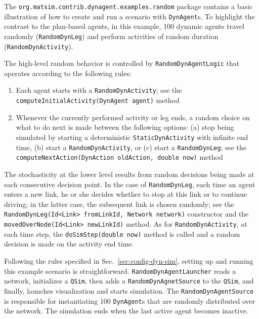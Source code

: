 The \lstinline$org.matsim.contrib.dynagent.examples.random$ package contains a basic illustration of how to create and run a scenario with \lstinline$DynAgent$s. To highlight the contrast to the plan-based agents, in this example, 100 dynamic agents travel randomly (\lstinline$RandomDynLeg$) and perform activities of random duration (\lstinline$RandomDynActivity$).

The high-level random behavior is controlled by \lstinline$RandomDynAgentLogic$ that operates according to the following rules:
%
\begin{enumerate}

	\item Each agent starts with a \lstinline$RandomDynActivity$; see the \lstinline$computeInitialActivity(DynAgent agent)$ method
	
	\item Whenever the currently performed activity or leg ends, a random choice on what to do next is made between the following options: (a) stop being simulated by starting a deterministic \lstinline$StaticDynActivity$ with infinite end time, (b) start a \lstinline$RandomDynActivity$, or (c) start a \lstinline$RandomDynLeg$; see the \lstinline$computeNextAction(DynAction oldAction, double now)$ method

\end{enumerate}

The stochasticity at the lower level results from random decisions being made at each consecutive decision point. In the case of \lstinline$RandomDynLeg$, each time an agent enters a new link, he or she decides whether to stop at this link or to continue driving; in the latter case, the subsequent link is chosen randomly; see the \lstinline$RandomDynLeg(Id<Link> fromLinkId, Network network)$ constructor and the \lstinline$movedOverNode(Id<Link> newLinkId)$ method. As for \lstinline$RandomDynActivity$, at each time step, the \lstinline$doSimStep(double now)$ method is called and a random decision is made on the activity end time.

Following the rules specified in Sec.~\ref{sec:config-dyn-sim}, setting up and running this example scenario is straightforward. \lstinline$RandomDynAgentLauncher$ reads a network, initializes a \lstinline$QSim$, then adds a \lstinline$RandomDynAgnetSource$ to the \lstinline$QSim$, and finally, launches visualization and starts simulation. The \lstinline$RandomDynAgentSource$ is responsible for instantiating 100 \lstinline$DynAgent$s that are randomly distributed over the network. The simulation ends when the last active agent becomes inactive.

